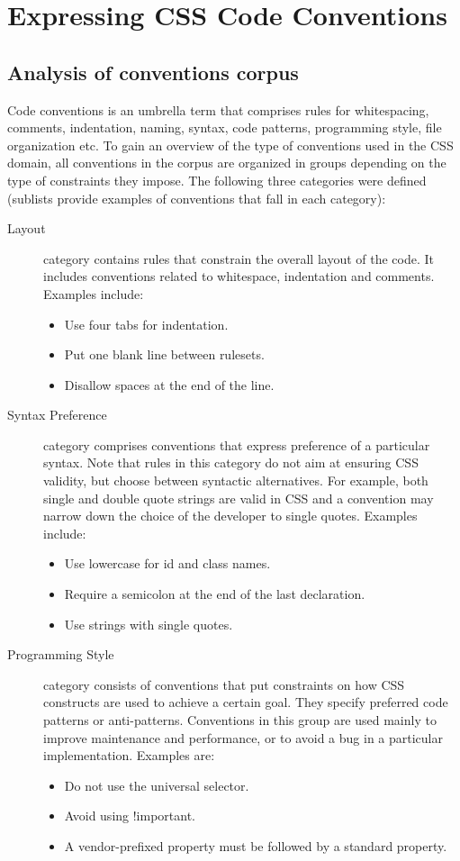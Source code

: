\chapter{Expressing CSS Code Conventions}
\label{sec:expressing}

\section{Analysis of conventions corpus}

Code conventions is an umbrella term that comprises rules for whitespacing, comments, indentation,
naming, syntax, code patterns, programming style, file organization etc. To gain an overview of the
type of conventions used in the CSS domain, all conventions in the corpus are organized in groups
depending on the type of constraints they impose. The following three categories were defined
(sublists provide examples of conventions that fall in each category):

\begin{description}
  \item[Layout] category contains rules that constrain the overall layout of the code. It includes conventions related to whitespace, indentation and comments. Examples include:
  \begin{itemize}
  \item Use four tabs for indentation.
  \item Put one blank line between rulesets.
  \item Disallow spaces at the end of the line.
  \end{itemize}
  \item[Syntax Preference] category comprises conventions that express preference of a particular syntax. Note that rules in this category do not aim at ensuring CSS validity, but choose between syntactic alternatives. For example, both single and double quote strings are valid in CSS and a convention may narrow down the choice of the developer to single quotes. Examples include:
  \begin{itemize}
  \item Use lowercase for id and class names.
  \item Require a semicolon at the end of the last declaration.
  \item Use strings with single quotes.
  \end{itemize}
  \item[Programming Style] category consists of conventions that put constraints on how CSS constructs are used to achieve a certain goal. They specify preferred code patterns or anti-patterns. Conventions in this group are used mainly to improve maintenance and performance, or to avoid a bug in a particular implementation. Examples are:
  \begin{itemize}
  \item Do not use the universal selector.
  \item Avoid using !important.
  \item A vendor-prefixed property must be followed by a standard property.
  \end{itemize}
\end{description}


